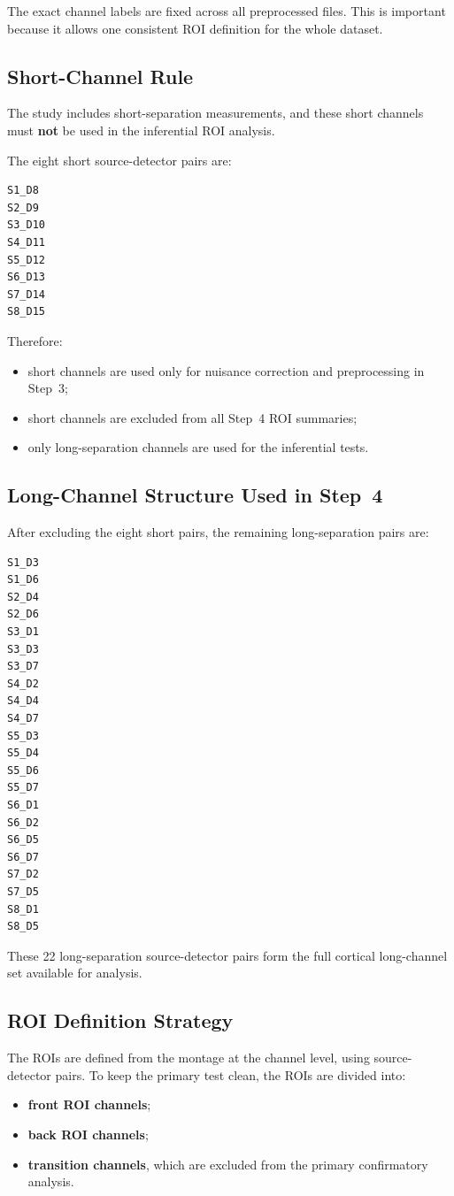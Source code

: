 The exact channel labels are fixed across all preprocessed files.
This is important because it allows one consistent ROI definition for the whole dataset.

\subsection{Short-Channel Rule}
The study includes short-separation measurements, and these short channels must \textbf{not}
be used in the inferential ROI analysis.

The eight short source-detector pairs are:
\begin{verbatim}
S1_D8
S2_D9
S3_D10
S4_D11
S5_D12
S6_D13
S7_D14
S8_D15
\end{verbatim}

Therefore:
\begin{itemize}
    \item short channels are used only for nuisance correction and preprocessing in Step~3;
    \item short channels are excluded from all Step~4 ROI summaries;
    \item only long-separation channels are used for the inferential tests.
\end{itemize}

\subsection{Long-Channel Structure Used in Step~4}
After excluding the eight short pairs, the remaining long-separation pairs are:
\begin{verbatim}
S1_D3
S1_D6
S2_D4
S2_D6
S3_D1
S3_D3
S3_D7
S4_D2
S4_D4
S4_D7
S5_D3
S5_D4
S5_D6
S5_D7
S6_D1
S6_D2
S6_D5
S6_D7
S7_D2
S7_D5
S8_D1
S8_D5
\end{verbatim}

These 22 long-separation source-detector pairs form the full cortical long-channel set available
for analysis.

\subsection{ROI Definition Strategy}
The ROIs are defined from the montage at the channel level, using source-detector pairs.
To keep the primary test clean, the ROIs are divided into:
\begin{itemize}
    \item \textbf{front ROI channels};
    \item \textbf{back ROI channels};
    \item \textbf{transition channels}, which are excluded from the primary confirmatory analysis.
\end{itemize}

